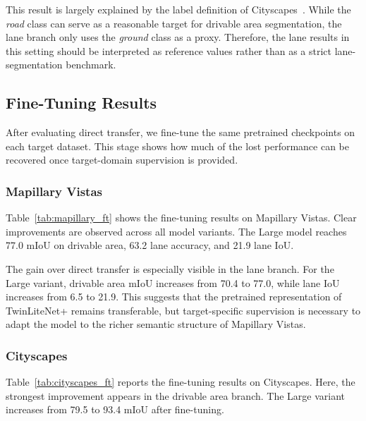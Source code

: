 \documentclass[conference]{IEEEtran}
\begin{document}
This result is largely explained by the label definition of Cityscapes~\cite{ref3}. While the \textit{road} class can serve as a reasonable target for drivable area segmentation, the lane branch only uses the \textit{ground} class as a proxy. Therefore, the lane results in this setting should be interpreted as reference values rather than as a strict lane-segmentation benchmark.

\subsection{Fine-Tuning Results}
After evaluating direct transfer, we fine-tune the same pretrained checkpoints on each target dataset. This stage shows how much of the lost performance can be recovered once target-domain supervision is provided.

\subsubsection{Mapillary Vistas}
Table~\ref{tab:mapillary_ft} shows the fine-tuning results on Mapillary Vistas. Clear improvements are observed across all model variants. The Large model reaches 77.0 mIoU on drivable area, 63.2 lane accuracy, and 21.9 lane IoU.

\begin{table}[!t]
\centering
\caption{Fine-tuning results on Mapillary Vistas.}
\label{tab:mapillary_ft}
\end{table}

The gain over direct transfer is especially visible in the lane branch. For the Large variant, drivable area mIoU increases from 70.4 to 77.0, while lane IoU increases from 6.5 to 21.9. This suggests that the pretrained representation of TwinLiteNet+ remains transferable, but target-specific supervision is necessary to adapt the model to the richer semantic structure of Mapillary Vistas.

\subsubsection{Cityscapes}
Table~\ref{tab:cityscapes_ft} reports the fine-tuning results on Cityscapes. Here, the strongest improvement appears in the drivable area branch. The Large variant increases from 79.5 to 93.4 mIoU after fine-tuning.
\end{document}
